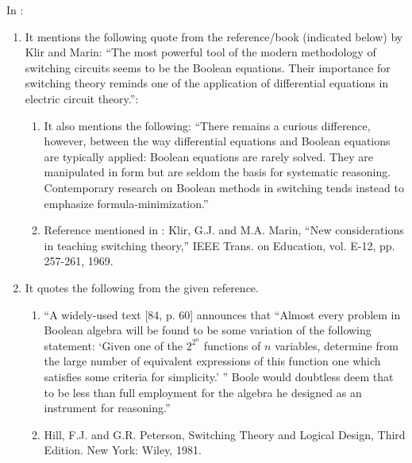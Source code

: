 In \cite{Brown2003}: \vspace{-0.3cm}
\begin{enumerate} \itemsep -4pt
\item It mentions the following quote from the reference/book (indicated below) by Klir and Marin: ``The most powerful tool of the modern methodology of switching circuits seems to be the Boolean equations. Their importance for switching theory reminds one of the application of differential equations in electric circuit theory.'': \vspace{-0.3cm}
	\begin{enumerate} \itemsep -2pt
	\item It also mentions the following: ``There remains a curious difference, however, between the way differential equations and Boolean equations are typically applied: Boolean equations are rarely solved. They are manipulated in form but are seldom the basis for systematic reasoning. Contemporary research on Boolean methods in switching tends instead to emphasize formula-minimization.''
	\item Reference mentioned in \cite{Brown2003}: Klir, G.J. and M.A. Marin, ``New considerations in teaching switching theory,'' IEEE Trans. on Education, vol. E-12, pp. 257-261, 1969.
	\end{enumerate}
\item It quotes the following from the given reference. \vspace{-0.3cm}
	\begin{enumerate} \itemsep -2pt
	\item ``A widely-used text [84, p. 60] announces that ``Almost every problem in Boolean algebra will be found to be some variation of the following statement: `Given one of the $2^{2^{n}}$ functions of $n$ variables, determine from the large number of equivalent expressions of this function one which satisfies some criteria for simplicity.' '' Boole would doubtless deem that to be less than full employment for the algebra he designed as an instrument for reasoning.''
	\item Hill, F.J. and G.R. Peterson, Switching Theory and Logical Design, Third Edition. New York: Wiley, 1981.
	\end{enumerate}
\end{enumerate}





























